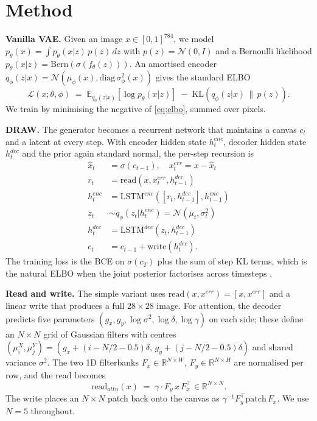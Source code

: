 \documentclass{article}
\begin{document}
\section{Method}
\label{sec:method}

\textbf{Vanilla VAE.} Given an image \(x \in [0,1]^{784}\), we model
\(p_\theta(x) = \int p_\theta(x|z)\, p(z)\, dz\) with \(p(z) = \mathcal{N}(0,I)\)
and a Bernoulli likelihood \(p_\theta(x|z) = \mathrm{Bern}(\sigma(f_\theta(z)))\).
An amortised encoder \(q_\phi(z|x) = \mathcal{N}(\mu_\phi(x), \mathrm{diag}\,
\sigma_\phi^2(x))\) gives the standard ELBO
\begin{equation}
\mathcal{L}(x;\theta,\phi) \;=\; \mathbb{E}_{q_\phi(z|x)}\!\left[\log p_\theta(x|z)\right]
\;-\; \mathrm{KL}\!\left(q_\phi(z|x) \,\|\, p(z)\right).
\label{eq:elbo}
\end{equation}
We train by minimising the negative of \eqref{eq:elbo}, summed over pixels.

\textbf{DRAW.} The generator becomes a recurrent network that maintains a
canvas \(c_t\) and a latent at every step. With encoder hidden state
\(h^{enc}_t\), decoder hidden state \(h^{dec}_t\) and the prior again standard
normal, the per-step recursion is
\begin{align}
\hat{x}_t &= \sigma(c_{t-1}), \quad x^{err}_t = x - \hat{x}_t \\
r_t &= \mathrm{read}(x, x^{err}_t, h^{dec}_{t-1}) \\
h^{enc}_t &= \mathrm{LSTM}^{enc}([r_t, h^{dec}_{t-1}], h^{enc}_{t-1}) \\
z_t &\sim q_\phi(z_t|h^{enc}_t) = \mathcal{N}(\mu_t, \sigma_t^2) \\
h^{dec}_t &= \mathrm{LSTM}^{dec}(z_t, h^{dec}_{t-1}) \\
c_t &= c_{t-1} + \mathrm{write}(h^{dec}_t).
\end{align}
The training loss is the BCE on \(\sigma(c_T)\) plus the sum of step KL terms,
which is the natural ELBO when the joint posterior factorises across
timesteps \citep{gregor2015draw}.

\textbf{Read and write.} The simple variant uses
\(\mathrm{read}(x,x^{err}) = [x, x^{err}]\) and a linear write that produces
a full \(28\times 28\) image. For attention, the decoder predicts five
parameters \((g_x, g_y, \log\sigma^2, \log\delta, \log\gamma)\) on each side;
these define an \(N\times N\) grid of Gaussian filters with centres
\((\mu^X_i, \mu^Y_j) = (g_x + (i - N/2 - 0.5)\delta,\, g_y + (j - N/2 - 0.5)\delta)\)
and shared variance \(\sigma^2\). The two 1D filterbanks
\(F_x \in \mathbb{R}^{N\times W}\), \(F_y \in \mathbb{R}^{N\times H}\) are
normalised per row, and the read becomes
\begin{equation}
\mathrm{read}_{attn}(x) \;=\; \gamma \cdot F_y\, x\, F_x^\top \in \mathbb{R}^{N\times N}.
\label{eq:read}
\end{equation}
The write places an \(N\times N\) patch back onto the canvas as
\(\gamma^{-1} F_y^\top \mathrm{patch}\, F_x\). We use \(N = 5\) throughout.
\end{document}
